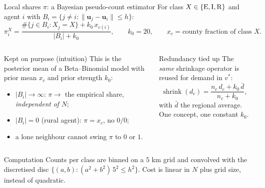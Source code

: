 ﻿\documentclass[9pt,aspectratio=169]{beamer}
\newenvironment{tied}{\begin{alertblock}{Redundancy tied up}\small}{\end{alertblock}}
\newenvironment{kept}{\begin{exampleblock}{Kept on purpose (intuition)}\small}{\end{exampleblock}}
\begin{document}
\begin{frame}{Local shares $\pi$: a Bayesian pseudo-count estimator}
 For class $X\in\{\mathrm{E},\mathrm{I},\mathrm{R}\}$ and agent $i$ with $B_i=\{j\ne i:\|\bm u_j-\bm u_i\|\le h\}$:
 \[
  \pi^X_i=\frac{\#\{j\in B_i:X_j=X\}+k_0\,x_{c(i)}}{|B_i|+k_0},\qquad k_0=20,
  \qquad x_c=\text{county fraction of class }X .
 \]
 \begin{columns}[T]
 \begin{kept}
  This is the posterior mean of a Beta--Binomial model with prior mean $x_c$ and prior strength $k_0$:
  \begin{itemize}\setlength\itemsep{1pt}
   \item $|B_i|\to\infty$: $\pi\to$ the empirical share, \emph{independent of $N$};
   \item $|B_i|=0$ (rural agent): $\pi=x_c$, no $0/0$;
   \item a lone neighbour cannot swing $\pi$ to $0$ or $1$.
  \end{itemize}
 \end{kept}
 \begin{tied}
  The \emph{same} shrinkage operator is reused for demand in $v^\ast$:
  \[ \operatorname{shrink}(d_c)=\frac{n_c\,d_c+k_0\,\bar d}{n_c+k_0},\]
  with $\bar d$ the regional average. One concept, one constant $k_0$.
 \end{tied}
 \end{columns}
 \begin{block}{Computation}\small
  Counts per class are binned on a $5$ km grid and convolved with the discretised disc $\{(a,b):(a^2+b^2)\,5^2\le h^2\}$. Cost is linear in $N$ plus grid size, instead of quadratic.
 \end{block}
\end{frame}

\end{document}
